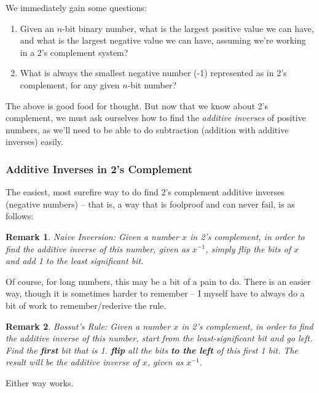 \documentclass[12pt]{article}
\newtheorem*{remark}
{Remark}
\begin{document}
    We immediately gain some questions:

    \begin{enumerate}
        \item Given an $n$-bit binary number, what is the largest positive value we can have,
        and what is the largest negative value we can have, assuming we're working in a 2's complement
        system?
        \item What is always the smallest negative number (-1) represented
        as in 2's complement, for any given $n$-bit number?
    \end{enumerate}

    The above is good food for thought. But now that
    we know about 2's complement, we must ask ourselves how to find the \textit{additive inverses}
    of positive numbers, as we'll need to be able to do subtraction (addition with additive inverses)
    easily.

    \subsubsection*{Additive Inverses in 2's Complement}

    The easiest, most surefire way to do find
    2's complement additive inverses (negative numbers) -- that is, a way that is foolproof and can never fail,
    is as follows:

    \begin{remark}
        Naive Inversion: Given a number $x$ in 2's complement, in order to find the additive inverse
        of this number, given as $x^{-1}$, simply flip the bits of $x$ and add 1 to the least significant bit.
    \end{remark}


    Of course, for long numbers, this may be a bit of a pain to do. There is an easier way, though it is sometimes
    harder to remember -- I myself have to always do a bit of work to remember/rederive the rule.

    \begin{remark}
        Bossut's Rule: Given a number $x$ in 2's complement, in order to find the additive inverse of this number,
        start from the least-significant bit and go left. Find the \textbf{first} bit that is 1. \textbf{flip}
        all the bits \textbf{to the left} of this first 1 bit. The result will be the additive inverse of $x$, given
        as $x^{-1}$.        
    \end{remark}

    Either way works.

    
        

    

    
    
        
\end{document}

